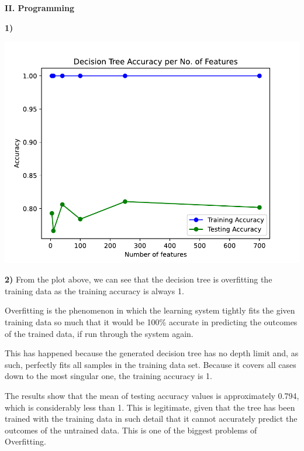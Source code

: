 \documentclass[11pt,a4paper]{article}
\begin{document}
\begin{center}
\textbf{II. Programming}
\end{center}

\begin{flushleft}
\textbf{1)} \par
\includegraphics[scale=0.75]{plot.pdf}
\end{flushleft}
\vspace*{2mm}

\begin{flushleft}
\textbf{2)}
From the plot above, we can see that the decision tree is overfitting the training data as the training accuracy is always 1.

Overfitting is the phenomenon in which the learning system tightly fits the given training data so much that it would be 100\% accurate in predicting the outcomes of the trained data, if run through the system again.

This has happened because the generated decision tree has no depth limit and, as such, perfectly fits all samples in the training data set. Because it covers all cases down to the most singular one, the training accuracy is 1.

The results show that the mean of testing accuracy values is approximately 0.794, which is considerably less than 1. This is legitimate, given that the tree has been trained with the training data in such detail that it cannot accurately predict the outcomes of the untrained data. This is one of the biggest problems of Overfitting.
\end{flushleft}
\end{document}
